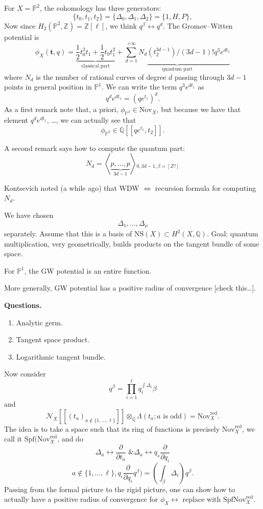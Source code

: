 \begin{example}
For $X=\mathbb{P}^2$, the cohomology
has three generators:
$$
\{t_0,t_1,t_2\}=
\{\Delta_0,\Delta_1,\Delta_2\}
=\{1,H,P\},
$$
Now since
$H_2(\mathbb{P}^2,\mathbb{Z})
=\mathbb{Z}[\ell]$,
we think $q^\beta \leftrightarrow
q^d$.
The Gromov--Witten potential is
$$
 \phi_X(\mathbf{t},q)
=\underbrace{
\frac{1}{2}t_0^2t_1
+\frac{1}{2}t_0t_1^2}
_{\text{classical part}}
+\underbrace{\sum_{d=1}^{+ \infty}
N_d (t_2^{3d-1})/(3d-1)!
q^3 e^{dt_1}}_{\text{quantum part}}
$$
where $N_d$ is the number of rational curves
of degree $d$ passing through $3d-1$
points in general position in $\mathbb{P}^1$.
We can write the term $q^3e^{dt_1}$ as
$$
q^de^{dt_1}=(qe^{t_1})^d.
$$
As a first remark note that,
 a priori, $\phi_{\mathbb{P}^2}
\in \text{Nov}_X$,
but because we have that element 
$q^de^{dt_1}$, …,
we can actually see that
$$
\phi_{\mathbb{P}^2} \in
\mathbb{Q}[[qe^{t_1},t_2]].
$$

A second remark says how to compute the
quantum part:
$$
N_d= \left\langle{}\underbrace{p,…,p}_{3d-1}\right\rangle{}
_{0,3d-1,\beta=[Z?]}
$$

\end{example}
Kontsevich noted (a while ago) that
WDW $\iff$ recursion formula for computing
$N_d$.

We have chosen 
$$
\Delta_1,…,\Delta_{\rho}
$$
separately. Assume that this is a basis
of $\text{NS}(X) \subset H^2(X,\mathbb{Q})$.
Goal: quantum multiplication, very
geometrically, builds products on the tangent
bundle of some space.

For $\mathbb{P}^1$, the GW potential
is an entire function.

More generally,
GW potential has a positive radius of
convergence [check this…].

\medskip\noindent
{\bf Questions.}

\begin{enumerate}
\item Analytic germ.
\item Tangent space product.
\item Logarithmic tangent bundle.
\end{enumerate}


\medskip\noindent
Now consider
$$
q^\beta
=\prod_{i=1}^\ell q_i^{\int \Delta_i} \beta
$$
and
$$
\mathcal{N}_X [[ (t_a)_{a \not \in
\{1,…,\ell\}}]]
\otimes_{\mathbb{Q}}
\Lambda(t_a; a \text{ is odd})
=\text{Nov}_X^{\text{red}}.
$$
The idea is to take a space such that
its ring of functions is precisely
$\text{Nov}_X^{\text{red}}$,
we call it
$\text{Spf}(\text{Nov}_X^{\text{red}}$,
and do
$$
\Delta_a \leftrightarrow
\frac{\partial }{\partial t_a}
\text{ \& }
\Delta_a \leftrightarrow
q_s \frac{\partial }{\partial q_i}
$$
$$
a \not \in \{ 1,…,\ell\},
q_i \frac{\partial }{\partial q_i}
q^\beta)=
\left(\int_\beta \Delta_i\right)
q^{\beta}.
$$
Passing from the formal picture to the
rigid picture, one can show how to actually
have a positive radius of convergence
for $\phi_X \leftrightarrow$
replace with
$\text{Spf}\text{Nov}_X^{\text{red}}$.

